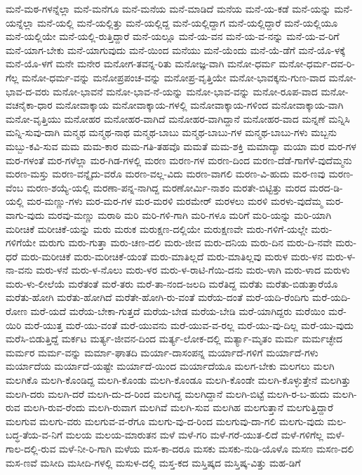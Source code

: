 {ಮನೆ-ಮಠ-ಗಳನ್ನೆಲ್ಲಾ
ಮನೆ-ಮನೆಗೂ
ಮನೆ-ಮನೆಯ
ಮನೆ-ಮಾಡಿದೆ
ಮನೆಯ
ಮನೆ-ಯ-ಕಡೆ
ಮನೆ-ಯನ್ನು
ಮನೆ-ಯನ್ನೆಲ್ಲಾ
ಮನೆ-ಯಲ್ಲಿ
ಮನೆ-ಯಲ್ಲಿತ್ತು
ಮನೆ-ಯಲ್ಲಿದ್ದ
ಮನೆ-ಯಲ್ಲಿದ್ದಾಗ
ಮನೆ-ಯಲ್ಲಿದ್ದಾರೆ
ಮನೆ-ಯಲ್ಲಿಯೂ
ಮನೆ-ಯಲ್ಲಿಯೇ
ಮನೆ-ಯಲ್ಲಿ-ರುತ್ತಿದ್ದಾರೆ
ಮನೆ-ಯಲ್ಲೂ
ಮನೆ-ಯ-ವನ
ಮನೆ-ಯ-ವ-ನನ್ನು
ಮನೆ-ಯ-ವ-ರಿಗೆ
ಮನೆ-ಯಾಗ-ಬೇಕು
ಮನೆ-ಯಾಗುವುದು
ಮನೆ-ಯಿಂದ
ಮನೆಯು
ಮನೆ-ಯೆಂದು
ಮನೆ-ಯೆ-ಡೆಗೆ
ಮನೆ-ಯೊ-ಳಕ್ಕೆ
ಮನೆ-ಯೊ-ಳಗೆ
ಮನೇ
ಮನೇರ
ಮನೋಗ-ತವನ್ನ-ರಿತು
ಮನೋಜ್ಞ-ವಾಗಿ
ಮನೋ-ಧರ್ಮ
ಮನೋ-ಧರ್ಮ-ದವ-ರಿ-ಗೆಲ್ಲ
ಮನೋ-ಧರ್ಮ-ವನ್ನು
ಮನೋಪ್ರಪಂಚ-ವನ್ನು
ಮನೋಪ್ರ-ವೃತ್ತಿಯೇ
ಮನೋ-ಭಾವಕ್ಕನು-ಗುಣ-ವಾದ
ಮನೋ-ಭಾವ-ದ-ವರು
ಮನೋ-ಭಾವನೆ
ಮನೋ-ಭಾವ-ನೆ-ಯನ್ನು
ಮನೋ-ಭಾವ-ವನ್ನು
ಮನೋ-ರೂಪ-ವಾದ
ಮನೋ-ವಚನೈಕಾ-ಧಾರ
ಮನೋವಾಕ್ಕಾಯ
ಮನೋವಾಕ್ಕಾಯ-ಗಳಲ್ಲಿ
ಮನೋವಾಕ್ಕಾಯ-ಗಳಿಂದ
ಮನೋವಾಕ್ಕಾಯ-ವಾಗಿ
ಮನೋ-ವೃತ್ತಿಯು
ಮನೋಹರ
ಮನೋಹರ-ವಾಗಿದೆ
ಮನೋಹರ-ವಾಗಿದ್ದಾನೆ
ಮನೋಹರ-ವಾದ
ಮನ್ನಣೆ
ಮನ್ನಿಸಿ
ಮನ್ನಿ-ಸುವು-ದಾಗಿ
ಮನ್ಮಥ
ಮನ್ಮಥ-ನಾಥ
ಮನ್ಮಥ-ಬಾಬು
ಮನ್ಮಥ-ಬಾಬು-ಗಳ
ಮನ್ಮಥ-ಬಾಬು-ಗಳು
ಮಬ್ಬನು
ಮಬ್ಬು-ಕವಿ-ಸುವ
ಮಮ
ಮಮ-ಕಾರ
ಮಮ-ಗತಿ-ತಹವೊ
ಮಮತೆ
ಮಮ-ಶಕ್ತಿ
ಮಮಾದ್ಯಾ
ಮಯಾ
ಮರ
ಮರ-ಗಳ
ಮರ-ಗಳಂತೆ
ಮರ-ಗಳೆಲ್ಲಾ
ಮರ-ಗಿಡ-ಗಳಲ್ಲಿ
ಮರಣ
ಮರಣ-ಗಳ
ಮರಣ-ದಿಂದ
ಮರಣ-ದೆಡೆ-ಗಾಗೆಳೆ-ವುದೆಮ್ಮನು
ಮರಣ-ಮಸ್ತು
ಮರಣ-ವನ್ನೈದು-ವರೊ
ಮರಣ-ವಲ್ಲ-ವಿದು
ಮರಣ-ವಾಗಲಿ
ಮರಣ-ವಿ-ಹುದು
ಮರ-ಣವು
ಮರಣ-ವೆಂಬ
ಮರಣ-ಶಯ್ಯೆ-ಯಲ್ಲಿ
ಮರಣಾ-ಪನ್ನ-ನಾಗಿದ್ದ
ಮರಣೋರ್ಮಿ-ನಾಶಂ
ಮರತೇ-ಬಿಟ್ಟಿತ್ತು
ಮರದ
ಮರದ-ಡಿ-ಯಲ್ಲಿ
ಮರ-ಮಣ್ಣು-ಗಳು
ಮರ-ಮರ-ಗಳ
ಮರ-ಮರಳಿ
ಮರಮೇರ್
ಮರಳಲು
ಮರಳಿ
ಮರಳು-ವುದೆಮ್ಮ
ಮರ-ವಾಗು-ವುದು
ಮರವು-ಮಣ್ಣು
ಮರಾಠಿ
ಮರಿ
ಮರಿ-ಗಳಿ-ಗಾಗಿ
ಮರಿ-ಗಳೂ
ಮರಿಗೆ
ಮರಿ-ಯನ್ನು
ಮರಿ-ಯಾಗಿ
ಮರೀಚಿಕೆ
ಮರೀಚಿಕೆ-ಯನ್ನು
ಮರು
ಮರುಕ
ಮರುಕ್ಷಣ-ದಲ್ಲಿಯೇ
ಮರುಕ್ಷಣವೇ
ಮರು-ಗಳಿಗೆ-ಯಲ್ಲೇ
ಮರು-ಗಳಿಗೆಯೇ
ಮರುಗು
ಮರು-ಗುತ್ತಾ
ಮರು-ಚಣ-ದಲಿ
ಮರು-ಜೀವ
ಮರು-ದನಿಯ
ಮರು-ದಿನ
ಮರು-ದಿ-ನವೇ
ಮರು-ಧರೆ
ಮರು-ಮರೀಚಿಕೆ
ಮರು-ಮರೀಚಿಕೆ-ಯಂತೆ
ಮರು-ಮಾತಿಲ್ಲದೆ
ಮರು-ಮಾತಿಲ್ಲವು
ಮರುಳ
ಮರು-ಳನ
ಮರು-ಳ-ನಾ-ವನು
ಮರು-ಳನೆ
ಮರು-ಳ-ನೊಲು
ಮರು-ಳರ
ಮರು-ಳ-ರಾಟಿ-ಗೆಯಿ-ದನು
ಮರು-ಳಾಗಿ
ಮರು-ಳಾದ
ಮರುಳು
ಮರು-ಳು-ಲೀಲೆಯೆ
ಮರೆತಂತೆ
ಮರೆ-ತರು
ಮರೆ-ತಾ-ನಂದ-ಜಲದಿ
ಮರೆತಿದ್ದ
ಮರೆತು
ಮರೆತು-ಬಿಡುತ್ತಾರೆಯೊ
ಮರೆತು-ಹೋಗಿ
ಮರೆತು-ಹೋಗಿದೆ
ಮರೆತೇ-ಹೋಗಿ-ರು-ವಂತೆ
ಮರೆಯ-ದಂತೆ
ಮರೆ-ಯದಿ-ರೆಂದಿಗು
ಮರೆ-ಯದಿ-ರೋಣ
ಮರೆ-ಯದೆ
ಮರೆಯ-ಬೇಕಾ-ಗುತ್ತದೆ
ಮರೆಯ-ಬೇಡ
ಮರೆಯ-ಬೇಡಿ
ಮರೆ-ಯಾಗಿದ್ದರು
ಮರೆಯಿಂ
ಮರೆ-ಯಿರಿ
ಮರೆ-ಯುತ್ತ
ಮರೆ-ಯು-ವಂತೆ
ಮರೆ-ಯುವನು
ಮರೆ-ಯುವ-ವ-ರಲ್ಲ
ಮರೆ-ಯು-ವು-ದಿಲ್ಲ
ಮರೆ-ಯು-ವುದು
ಮರೆಸಿ-ಬಿಡುತ್ತಿದ್ದೆ
ಮರ್ಕಟ
ಮರ್ತ್ಯ-ಜೀವನ-ದಿಂದ
ಮರ್ತ್ಯ-ಲೋಕ-ದಲ್ಲಿ
ಮರ್ತ್ಯಾ-ಮೃತಂ
ಮರ್ಮ
ಮರ್ಮಚ್ಛೇದ
ಮರ್ಮರ
ಮರ್ಮ-ವನ್ನು
ಮರ್ಮಾ-ಘಾತದಿ
ಮರ್ಯಾ-ದಾಸಂಪನ್ನ
ಮರ್ಯಾದೆ-ಗಳಿಗೆ
ಮರ್ಯಾದೆ-ಗಳು
ಮರ್ಯಾದೆಯ
ಮರ್ಯಾದೆ-ಯಷ್ಟೇ
ಮರ್ಯಾದೆ-ಯಿಂದ
ಮರ್ಯಾದೆಯೂ
ಮಲಗ-ಬೇಕು
ಮಲಗಲು
ಮಲಗಿ
ಮಲಗಿಕೊ
ಮಲಗಿ-ಕೊಂಡಿದ್ದ
ಮಲಗಿ-ಕೊಂಡು
ಮಲಗಿ-ಕೊಂಡೂ
ಮಲಗಿ-ಕೊಂಡೇ
ಮಲಗಿ-ಕೊಳ್ಳುತ್ತೇನೆ
ಮಲಗಿತ್ತು
ಮಲಗಿ-ದರು
ಮಲಗಿ-ದರೆ
ಮಲಗಿ-ದು-ದ-ರಿಂದ
ಮಲಗಿದ್ದ
ಮಲಗಿದ್ದಾನೆ
ಮಲಗಿ-ಬಿಟ್ಟೆ
ಮಲಗಿ-ರ-ಬ-ಹುದು
ಮಲಗಿ-ರುವ
ಮಲಗಿ-ರುವ-ರೆಂದು
ಮಲಗಿ-ರುವಾಗ
ಮಲಗಿವೆ
ಮಲಗಿ-ಸುವ
ಮಲಗಿಹ
ಮಲಗುತ್ತಾನೆ
ಮಲಗುತ್ತಿದ್ದಾರೆ
ಮಲಗುವ
ಮಲಗು-ವರು
ಮಲಗುವ-ವ-ರೆಗೂ
ಮಲಗು-ವು-ದ-ರಿಂದ
ಮಲಗುವು-ದಾ-ಗಲಿ
ಮಲಗು-ವುದು
ಮಲ-ಬದ್ಧ-ತೆಯ-ವ-ನಿಗೆ
ಮಲಯ
ಮಲಯ-ಮಾರುತನ
ಮಳೆ
ಮಳೆ-ಗರಿ
ಮಳೆ-ಗರೆ-ಯುತ-ಲಿದೆ
ಮಳೆ-ಗಳಿಗೆಲ್ಲ
ಮಳೆ-ಗಾಲ-ದಲ್ಲಿ-ರುವ
ಮಳೆ-ನೀ-ರಿ-ಗಾಗಿ
ಮಳೆಯ
ಮಸ-ಕಾ-ದರೂ
ಮಸಕು
ಮಸಕು-ನುಡಿ-ಯೊಳೊ
ಮಸಣ
ಮಸಣ-ದಲಿ
ಮಸ-ಣವೆ
ಮಸೀದಿ
ಮಸೀದಿ-ಗಳಲ್ಲಿ
ಮಸುಳ-ದಲ್ಲಿ
ಮಸ್ತ-ಕದ
ಮಸ್ತಿಷ್ಕದ
ಮಸ್ತಿಷ್ಕ-ವಿತ್ತು
ಮಹ-ಡಿಗೆ
}
